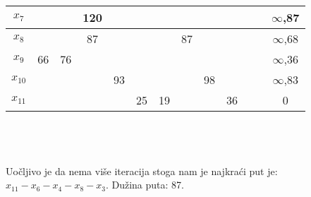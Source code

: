 \documentclass[12pt]{article}
\begin{document}
\begin{enumerate}
\begin{tabular}{|c|c|c|c|c|c|c|c|c|c|c|c|c|}
$x_7$    & {\color[HTML]{000000} }         & {\color[HTML]{000000} }         & {\color[HTML]{000000} 120}      & {\color[HTML]{000000} }         & {\color[HTML]{000000} }         & {\color[HTML]{000000} }         & {\color[HTML]{000000} }         & {\color[HTML]{000000} }         & {\color[HTML]{000000} }         & {\color[HTML]{000000} }         & {\color[HTML]{000000} }  & {\color[HTML]{000000} $\infty$,87} \\ \hline
$x_8$    & {\color[HTML]{000000} }         & {\color[HTML]{000000} }         & {\color[HTML]{FE0000} 87}       & {\color[HTML]{000000} }         & {\color[HTML]{000000} }         & {\color[HTML]{000000} }         & {\color[HTML]{FE0000} 87}       & {\color[HTML]{000000} }         & {\color[HTML]{000000} }         & {\color[HTML]{000000} }         & {\color[HTML]{000000} }  & {\color[HTML]{000000} $\infty$,68} \\ \hline
$x_9$    & {\color[HTML]{000000} 66}       & {\color[HTML]{FE0000} 76}       & {\color[HTML]{000000} }         & {\color[HTML]{000000} }         & {\color[HTML]{000000} }         & {\color[HTML]{000000} }         & {\color[HTML]{000000} }         & {\color[HTML]{000000} }         & {\color[HTML]{000000} }         & {\color[HTML]{000000} }         & {\color[HTML]{000000} }  & {\color[HTML]{000000} $\infty$,36} \\ \hline
$x_{10}$ & {\color[HTML]{000000} }         & {\color[HTML]{000000} }         & {\color[HTML]{000000} }         & {\color[HTML]{000000} 93}       & {\color[HTML]{000000} }         & {\color[HTML]{000000} }         & {\color[HTML]{000000} }         & {\color[HTML]{000000} 98}       & {\color[HTML]{000000} }         & {\color[HTML]{000000} }         & {\color[HTML]{000000} }  & {\color[HTML]{000000} $\infty$,83} \\ \hline
$x_{11}$ & {\color[HTML]{000000} }         & {\color[HTML]{000000} }         & {\color[HTML]{000000} }         & {\color[HTML]{000000} }         & {\color[HTML]{FE0000} 25}       & {\color[HTML]{FE0000} 19}       & {\color[HTML]{000000} }         & {\color[HTML]{000000} }         & {\color[HTML]{FE0000} 36}       & {\color[HTML]{000000} }         & {\color[HTML]{000000} }  & {\color[HTML]{000000} 0}           \\ \hline
\end{tabular}
\\
\\
\\
Uočljivo je da nema više iteracija stoga nam je najkraći put je: $x_{11} - x_6 - x_4 - x_8 - x_3$. Dužina puta: 87.


\end{enumerate}
\end{document}
